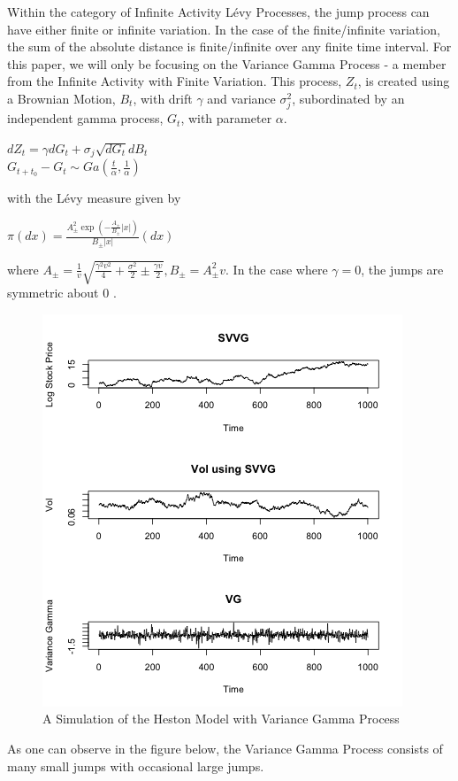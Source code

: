 \documentclass[12pt]{article}
\theoremstyle{definition}
\begin{document}
Within the category of Infinite Activity L\'{e}vy Processes, the jump process can have either finite or infinite variation. In the case of the finite/infinite variation, the sum of the absolute distance is finite/infinite over any finite time interval. For this paper, we will only be focusing on the Variance Gamma Process - a member from the Infinite Activity with Finite Variation. This process, $Z_{t}$, is created using a Brownian Motion, $B_{t}$, with drift $\gamma$ and variance $\sigma_{j}^2$, subordinated by an independent gamma process, $G_{t}$, with parameter $\alpha$.
\begin{center}
$dZ_{t} = \gamma dG_{t} + \sigma_{j}\sqrt{dG_{t}}dB_{t}$\\
$G_{t+t_{0}} - G_{t} \sim Ga(\frac{t}{\alpha},\frac{1}{\alpha})$
\end{center}
with the L\'{e}vy measure given by
\begin{center}
$\pi(dx) = \frac{A^{2}_{\pm}\exp(-\frac{A_{\pm}}{B_{\pm}}|x|)}{B_{\pm}|x|}(dx)$
\end{center}
where $A_{\pm}=\frac{1}{v}\sqrt{\frac{\gamma^{2}v^{2}}{4}+\frac{\sigma^{2}}{2} \pm \frac{\gamma v}{2}},B_{\pm}=A^{2}_{\pm}v$. In the case where $\gamma=0$, the jumps are symmetric about 0 \citep{li2008bayesian}.
\begin{figure}[h]
\centering
\includegraphics[scale=0.8]{simsvvg}
\caption{A Simulation of the Heston Model with Variance Gamma Process}
\end{figure}
As one can observe in the figure below, the Variance Gamma Process consists of many small jumps with occasional large jumps.
\end{document}
